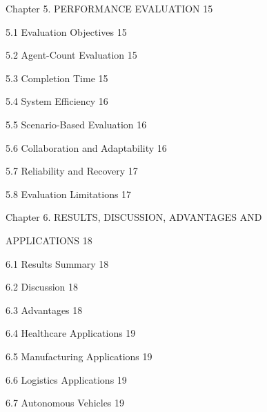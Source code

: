 \documentclass[12pt,letterpaper]{article}
\begin{document}
\thispagestyle{empty}
\vspace*{-12pt}
\begingroup
\setlength{\parskip}{0pt}
\fontsize{11.3pt}{12.4pt}\selectfont
\noindent Chapter 5. PERFORMANCE EVALUATION \hfill 15\par
\noindent\hspace*{28pt} 5.1 Evaluation Objectives \hfill 15\par
\noindent\hspace*{28pt} 5.2 Agent-Count Evaluation \hfill 15\par
\noindent\hspace*{28pt} 5.3 Completion Time \hfill 15\par
\noindent\hspace*{28pt} 5.4 System Efficiency \hfill 16\par
\noindent\hspace*{28pt} 5.5 Scenario-Based Evaluation \hfill 16\par
\noindent\hspace*{28pt} 5.6 Collaboration and Adaptability \hfill 16\par
\noindent\hspace*{28pt} 5.7 Reliability and Recovery \hfill 17\par
\noindent\hspace*{28pt} 5.8 Evaluation Limitations \hfill 17\par
\noindent Chapter 6. RESULTS, DISCUSSION, ADVANTAGES AND \hfill \par
\noindent APPLICATIONS \hfill 18\par
\noindent\hspace*{28pt} 6.1 Results Summary \hfill 18\par
\noindent\hspace*{28pt} 6.2 Discussion \hfill 18\par
\noindent\hspace*{28pt} 6.3 Advantages \hfill 18\par
\noindent\hspace*{28pt} 6.4 Healthcare Applications \hfill 19\par
\noindent\hspace*{28pt} 6.5 Manufacturing Applications \hfill 19\par
\noindent\hspace*{28pt} 6.6 Logistics Applications \hfill 19\par
\noindent\hspace*{28pt} 6.7 Autonomous Vehicles \hfill 19\par
\end{document}
